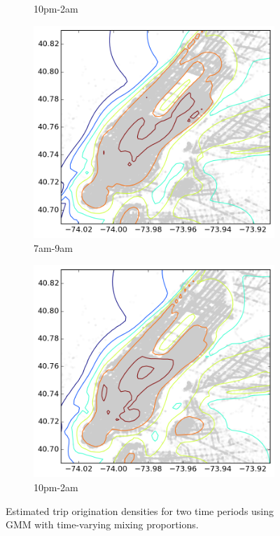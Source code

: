 \documentclass[12pt]{article}
\theoremstyle{definition}
\theoremstyle{algodesc}
\begin{document}
\begin{figure}[htbp]
\begin{subfigure}[t]{.49\linewidth}
    \caption{10pm-2am} \label{fig:dist:night}
  \end{subfigure}
  \begin{subfigure}[t]{.49\linewidth}
    \includegraphics[width=\linewidth]{./include/gmm_cat_morn2.png}
    \caption{7am-9am} \label{fig:dist:morning2}
  \end{subfigure}
  \begin{subfigure}[t]{.49\linewidth}
    \includegraphics[width=\linewidth]{./include/gmm_cat_night2.png}
    \caption{10pm-2am} \label{fig:dist:night2}
  \end{subfigure}
  \caption{Estimated trip origination densities for two time periods using GMM with time-varying mixing proportions.}
  \label{fig:dist}
\end{figure}
\end{document}
